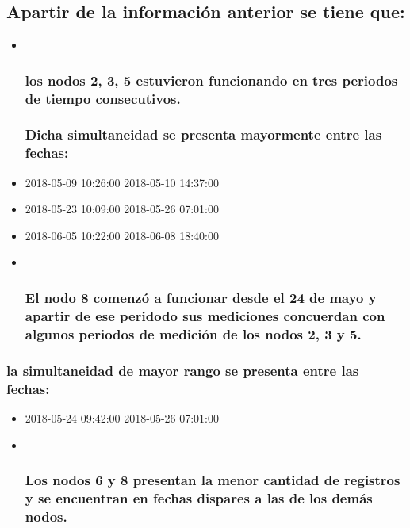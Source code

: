 \documentclass[11pt]{article}
\begin{document}
    \subsection{Apartir de la información anterior se tiene
que:}\label{apartir-de-la-informaciuxf3n-anterior-se-tiene-que}

\begin{itemize}
\item ~
  \subsubsection{los nodos 2, 3, 5 estuvieron funcionando en tres
  periodos de tiempo
  consecutivos.}\label{los-nodos-2-3-5-estuvieron-funcionando-en-tres-periodos-de-tiempo-consecutivos.}

  \subsubsection{Dicha simultaneidad se presenta mayormente entre las
  fechas:}\label{dicha-simultaneidad-se-presenta-mayormente-entre-las-fechas}
\item
  2018-05-09 10:26:00 2018-05-10 14:37:00\\
\item
  2018-05-23 10:09:00 2018-05-26 07:01:00\\
\item
  2018-06-05 10:22:00 2018-06-08 18:40:00
\item ~
  \subsubsection{El nodo 8 comenzó a funcionar desde el 24 de mayo y
  apartir de ese peridodo sus mediciones concuerdan con algunos periodos
  de medición de los nodos 2, 3 y
  5.}\label{el-nodo-8-comenzuxf3-a-funcionar-desde-el-24-de-mayo-y-apartir-de-ese-peridodo-sus-mediciones-concuerdan-con-algunos-periodos-de-mediciuxf3n-de-los-nodos-2-3-y-5.}
\end{itemize}

\subsubsection{la simultaneidad de mayor rango se presenta entre las
fechas:}\label{la-simultaneidad-de-mayor-rango-se-presenta-entre-las-fechas}

\begin{itemize}
\item
  2018-05-24 09:42:00 2018-05-26 07:01:00\\
\item ~
  \subsubsection{Los nodos 6 y 8 presentan la menor cantidad de
  registros y se encuentran en fechas dispares a las de los demás
  nodos.}\label{los-nodos-6-y-8-presentan-la-menor-cantidad-de-registros-y-se-encuentran-en-fechas-dispares-a-las-de-los-demuxe1s-nodos.}
\end{itemize}
\end{document}
